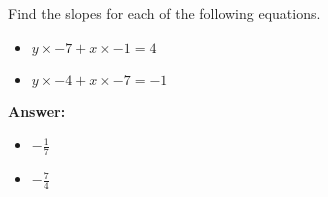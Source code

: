  Find the slopes for each of the following equations. \begin{itemize}\item \( y \times -7 + x \times -1 = 4 \)\item \( y \times -4 + x \times -7 = -1 \)\end{itemize}

        \textbf{Answer:} \begin{itemize}\item \( -\frac{1}{7} \)\item \( -\frac{7}{4} \)\end{itemize}
